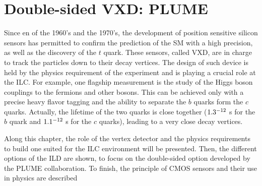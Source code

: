 \chapter{Double-sided VXD: PLUME}
\label{chap:vxd}
  
  Since en of the 1960's and the 1970's, the development of position sensitive silicon sensors has permitted to confirm the prediction of the \acrfull{SM} with a high precision, as well as the discovery of the $t$ quark.
  These sensors, called \acrfull{VXD}, are in charge to track the particles down to their decay vertices.
  The design of such device is held by the physics requirement of the experiment and is playing a crucial role at the \acrfull{ILC}.
  For example, one flagship measurement is the study of the Higgs boson couplings to the fermions and other bosons.
  This can be achieved only with a precise heavy flavor tagging and the ability to separate the $b$ quarks form the $c$ quarks. 
  Actually, the lifetime of the two quarks is close together ($1.3 \time 10^{-12}$ s for the $b$ quark and $1.1 \time 10^{-12}$ s for the $c$ quarks), leading to a very close decay vertices. 
  
  Along this chapter, the role of the vertex detector and the physics requirements to build one suited for the \gls{ILC} environment will be presented.
  Then, the different options of the \acrfull{ILD} are shown, to focus on the double-sided option developed by the \gls{PLUME} collaboration.
  To finish, the principle of \gls{CMOS} sensors and their use in physics are described



